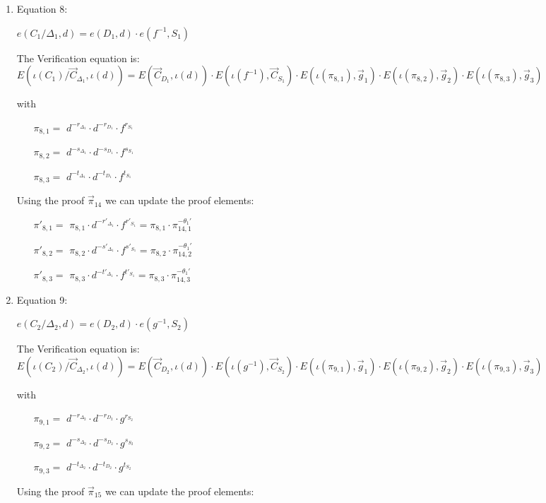 \begin{description}
\begin{enumerate}
\begin{enumerate}
      
    \item Equation 8:

      $e(C_1/\boxed{\Delta_1}, d) = e (\boxed{D_1},d) \cdot e(f^{-1}, \boxed{S_1})$

      The Verification equation is: $ E(\iota(C_1)/\vec{C}_{\Delta_1}, \iota(d)) = E(\vec{C}_{D_1},\iota(d)) \cdot E(\iota(f^{-1}), \vec{C}_{S_1})\cdot E(\iota(\pi_{8,1}), \vec{g}_1)\cdot E(\iota(\pi_{8,2}), \vec{g}_2)\cdot E(\iota(\pi_{8,3}), \vec{g}_3)$

      with
      \begin{itemize}
      \item[$\pi_{8,1} = $] $d^{-r_{\Delta_1}} \cdot d^{-r_{D_1}} \cdot f^{r_{S_1}}$
      \item[$\pi_{8,2} = $] $d^{-s_{\Delta_1}} \cdot d^{-s_{D_1}} \cdot f^{s_{S_1}}$
      \item[$\pi_{8,3} = $] $d^{-t_{\Delta_1}} \cdot d^{-t_{D_1}} \cdot f^{t_{S_1}}$
      \end{itemize}
      Using the proof $\vec{\pi}_{14}$ we can update the proof elements:
      \begin{itemize}
      \item[$\pi'_{8,1} = $] $\pi_{8,1} \cdot d^{-r'_{\Delta_1}} \cdot f^{r'_{S_1}} = \pi_{8,1} \cdot \pi_{14,1}^{-\theta_1'}$
      \item[$\pi'_{8,2} = $] $\pi_{8,2} \cdot d^{-s'_{\Delta_1}} \cdot f^{s'_{S_1}} = \pi_{8,2} \cdot \pi_{14,2}^{-\theta_1'}$
      \item[$\pi'_{8,3} = $] $\pi_{8,3} \cdot d^{-t'_{\Delta_1}} \cdot f^{t'_{S_1}} = \pi_{8,3} \cdot \pi_{14,3}^{-\theta_1'}$
      \end{itemize}

    \item Equation 9:

      $e(C_2/\boxed{\Delta_2}, d) = e (\boxed{D_2},d) \cdot e(g^{-1}, \boxed{S_2})$

      The Verification equation is: $ E(\iota(C_2)/\vec{C}_{\Delta_2}, \iota(d)) = E(\vec{C}_{D_2},\iota(d)) \cdot E(\iota(g^{-1}), \vec{C}_{S_2})\cdot E(\iota(\pi_{9,1}), \vec{g}_1)\cdot E(\iota(\pi_{9,2}), \vec{g}_2)\cdot E(\iota(\pi_{9,3}), \vec{g}_3)$

      with
      \begin{itemize}
      \item[$\pi_{9,1} = $] $d^{-r_{\Delta_2}} \cdot d^{-r_{D_2}} \cdot g^{r_{S_2}}$
      \item[$\pi_{9,2} = $] $d^{-s_{\Delta_2}} \cdot d^{-s_{D_2}} \cdot g^{s_{S_2}}$
      \item[$\pi_{9,3} = $] $d^{-t_{\Delta_2}} \cdot d^{-t_{D_2}} \cdot g^{t_{S_2}}$
      \end{itemize}
      Using the proof $\vec{\pi}_{15}$ we can update the proof elements:
      

\end{enumerate}
\end{enumerate}
\end{description}
